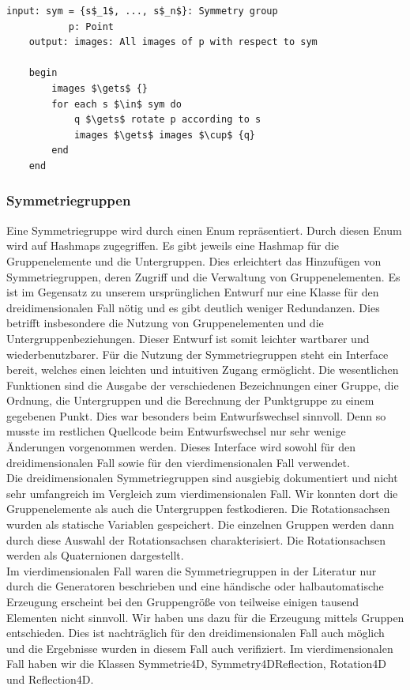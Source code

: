         \begin{lstlisting}[mathescape, morekeywords={for, each, do, begin,input, output, end, return}, caption={Peusdocode der Bildmengenberechnung}, label=alg:images]
    input: sym = {s$_1$, ..., s$_n$}: Symmetry group
           p: Point
    output: images: All images of p with respect to sym
    
    begin
        images $\gets$ {}
        for each s $\in$ sym do
            q $\gets$ rotate p according to s
            images $\gets$ images $\cup$ {q}
        end
    end
        \end{lstlisting}
    \subsubsection{Symmetriegruppen}
    Eine Symmetriegruppe wird durch einen Enum repräsentiert. Durch diesen Enum wird auf Hashmaps zugegriffen. Es gibt jeweils eine Hashmap für die Gruppenelemente und die Untergruppen. Dies erleichtert das Hinzufügen von Symmetriegruppen, deren Zugriff und die Verwaltung von Gruppenelementen. Es ist im Gegensatz zu unserem ursprünglichen Entwurf nur eine Klasse für den dreidimensionalen Fall nötig und es gibt deutlich weniger Redundanzen. Dies betrifft insbesondere die Nutzung von Gruppenelementen und die Untergruppenbeziehungen. Dieser Entwurf ist somit leichter wartbarer und wiederbenutzbarer.
    Für die Nutzung der Symmetriegruppen steht ein Interface bereit, welches einen leichten und intuitiven Zugang ermöglicht. Die wesentlichen Funktionen sind die Ausgabe der verschiedenen Bezeichnungen einer Gruppe, die Ordnung, die Untergruppen und die Berechnung der Punktgruppe zu einem gegebenen Punkt. Dies war besonders beim Entwurfswechsel sinnvoll. Denn so musste im restlichen Quellcode beim Entwurfswechsel nur sehr wenige Änderungen vorgenommen werden. Dieses Interface wird sowohl für den dreidimensionalen Fall sowie für den vierdimensionalen Fall verwendet.\\ 
    Die dreidimensionalen Symmetriegruppen sind ausgiebig dokumentiert und nicht sehr umfangreich im Vergleich zum vierdimensionalen Fall. Wir konnten dort die Gruppenelemente als auch die Untergruppen festkodieren. Die Rotationsachsen wurden als statische Variablen gespeichert. Die einzelnen Gruppen werden dann durch diese Auswahl der Rotationsachsen charakterisiert. Die Rotationsachsen werden als Quaternionen dargestellt. \\
Im vierdimensionalen Fall waren die Symmetriegruppen in der Literatur nur durch die Generatoren beschrieben und eine händische oder halbautomatische Erzeugung erscheint bei den Gruppengröße von teilweise einigen tausend Elementen nicht sinnvoll. Wir haben uns dazu für die Erzeugung mittels Gruppen entschieden. Dies ist nachträglich für den dreidimensionalen Fall auch möglich und die Ergebnisse wurden in diesem Fall auch verifiziert. Im vierdimensionalen Fall haben wir die Klassen Symmetrie4D, Symmetry4DReflection, Rotation4D und Reflection4D.

